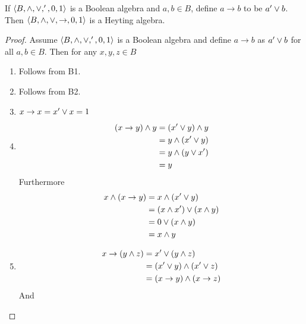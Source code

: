 \begin{theorem*}
If $\langle B, \wedge, \vee, ', 0 , 1\rangle$ is a Boolean algebra and $a, b \in B$, define $a\to b$ to be $a'\vee b$.
Then $\langle B, \wedge, \vee, \to, 0, 1\rangle$ is a Heyting algebra.
\end{theorem*}

\begin{proof}
Assume $\langle B, \wedge, \vee, ', 0 , 1\rangle$ is a Boolean algebra and define $a\to b$ as $a'\vee b$ for all $a, b \in B$.
Then for any $x, y, z \in B$
\begin{enumerate}[(H1)]
  \item Follows from B1.
  \item Follows from B2.
  \item $x\to x = x'\vee x = 1$
  \item 
    \begin{align*}
      (x\to y) \wedge y &= (x' \vee y) \wedge y \\
                       &= y \wedge (x' \vee y) \\
                       &= y \wedge (y \vee x') \\
                       &= y
    \end{align*}
    Furthermore
    \begin{align*}
      x \wedge (x\to y) &= x \wedge (x' \vee y) \\
                       &= (x \wedge x') \vee (x \wedge y) \\
                       &= 0 \vee (x \wedge y) \\
                       &= x \wedge y \\
    \end{align*}
  \item 
    \begin{align*}
      x \to (y \wedge z) &= x' \vee (y \wedge z) \\ 
                        &= (x' \vee y) \wedge (x' \vee z) \\
                        &= (x \to y) \wedge (x \to z)
    \end{align*}
    And
\end{enumerate}
\end{proof}

